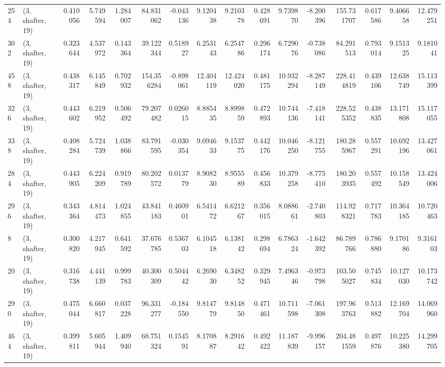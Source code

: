 \begin{tabular}{llrrrrrrrrrrrrrr}
254 &  (3, shafter, 19) &   0.410056 &   5.749594 &   1.284007 &    84.831062 &  -0.043136 &   9.120438 &   9.210378 &  0.428691 &   9.739870 &  -8.200396 &   155.731707 &  0.617586 &   9.406658 &  12.479251 \\
302 &  (3, shafter, 19) &   0.323644 &   4.537972 &   0.143364 &    39.122344 &   0.518927 &   6.253143 &   6.254786 &  0.296174 &   6.729076 &  -0.738086 &    84.291513 &  0.793014 &   9.151325 &   9.181041 \\
458 &  (3, shafter, 19) &   0.438317 &   6.145849 &   0.702932 &   154.356284 &  -0.898061 &  12.404119 &  12.424020 &  0.481175 &  10.932294 &  -8.287149 &   228.414819 &  0.439106 &  12.638749 &  15.113399 \\
326 &  (3, shafter, 19) &   0.443602 &   6.219952 &   0.506492 &    79.207482 &   0.026015 &   8.885435 &   8.899859 &  0.472893 &  10.744136 &  -7.418141 &   228.525352 &  0.438835 &  13.171808 &  15.117055 \\
338 &  (3, shafter, 19) &   0.408284 &   5.724739 &   1.038866 &    83.791595 &  -0.030354 &   9.094633 &   9.153775 &  0.442176 &  10.046250 &  -8.121755 &   180.285967 &  0.557291 &  10.692196 &  13.427061 \\
284 &  (3, shafter, 19) &   0.443905 &   6.224209 &   0.919789 &    80.202572 &   0.013779 &   8.908230 &   8.955589 &  0.456833 &  10.379258 &  -8.775410 &   180.203935 &  0.557492 &  10.158549 &  13.424006 \\
296 &  (3, shafter, 19) &   0.343364 &   4.814473 &   1.024855 &    43.841183 &   0.460901 &   6.541472 &   6.621267 &  0.356015 &   8.088661 &  -2.740803 &   114.928321 &  0.717783 &  10.364185 &  10.720463 \\
8   &  (3, shafter, 19) &   0.300820 &   4.217945 &   0.641592 &    37.676785 &   0.536703 &   6.104518 &   6.138142 &  0.298694 &   6.786324 &  -1.642392 &    86.789766 &  0.786880 &   9.170186 &   9.316103 \\
20  &  (3, shafter, 19) &   0.316738 &   4.441139 &   0.999783 &    40.300309 &   0.504442 &   6.269030 &   6.348252 &  0.329945 &   7.496346 &  -0.973798 &   103.505027 &  0.745834 &  10.127030 &  10.173742 \\
290 &  (3, shafter, 19) &   0.475044 &   6.660817 &   0.037228 &    96.331277 &  -0.184550 &   9.814779 &   9.814850 &  0.471461 &  10.711598 &  -7.061308 &   197.963763 &  0.513882 &  12.169704 &  14.069960 \\
464 &  (3, shafter, 19) &   0.399811 &   5.605944 &   1.409940 &    68.751324 &   0.154591 &   8.170887 &   8.291642 &  0.492422 &  11.187839 &  -9.996157 &   204.481559 &  0.497876 &  10.225380 &  14.299705 \\

\end{tabular}
